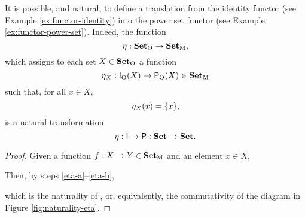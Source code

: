 \begin{example}
  \label{ex:natural-identity-power-set}


  It is possible, and natural, to define a translation from the
  identity functor (see Example \ref{ex:functor-identity}) into the power
  set functor (see Example \ref{ex:functor-power-set}). Indeed, the
  function
  \begin{equation*}
    \eta: \mathcal{\mathbf{Set}}_{\operatorname{O}} \to \mathcal{\mathbf{Set}}_{\operatorname{M}}
    \text{,}
  \end{equation*}
  which assigns to each set $X \in \mathcal{\mathbf{Set}}_{\operatorname{O}}$ a function
  \begin{equation*}
    \eta_{X}: \mathsf{I}_{\operatorname{O}}(X) \to \mathsf{P}_{\operatorname{O}}(X) \in \mathcal{\mathbf{Set}}_{\operatorname{M}}
  \end{equation*}
  such that, for all $x \in X$,
  \begin{equation}
    \label{eq:eta}
    \eta_{X}(x) = \{x\}
    \text{,}
  \end{equation}
  is a natural transformation
  \begin{equation*}
    \eta: \mathsf{I} \to \mathsf{P}: \mathbf{Set} \to \mathbf{Set}
    \text{.}
  \end{equation*}

  \begin{proof}

    Given a function $f: X \to Y \in \mathcal{\mathbf{Set}}_{\operatorname{M}}$ and an element $x
    \in X$,
    \begin{steps}
      \label{eta-a}
        \eqbydef{\comp}
        \eqbydef{\nat{\eta} \eqref{eq:eta}}
        \eqbydef{\nat{\eta} \eqref{eq:eta}}
        \eqbydef{\comp}
      \label{eta-b}
    \end{steps}
    Then, by steps \ref{eta-a}--\ref{eta-b},
    \begin{steps}[resume]
    \end{steps}
    which is the naturality of \nat{\eta}, or, equivalently, the
    commutativity of the diagram in Figure \ref{fig:naturality-eta}.


\end{proof}
\end{example}
